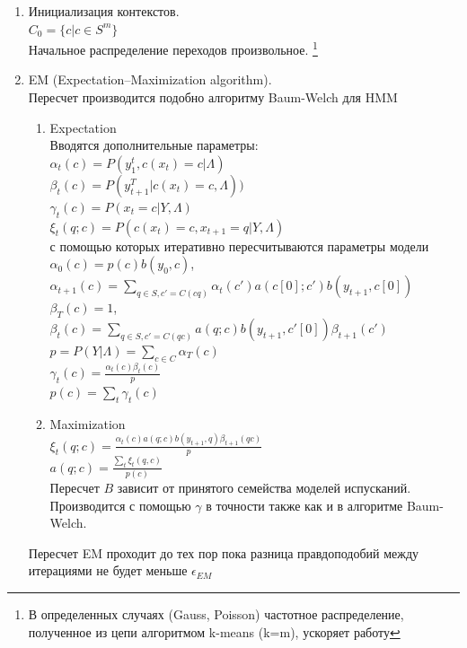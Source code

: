 \documentclass[10pt,a4paper]{article}
\begin{document}
\begin{enumerate}
\item Инициализация контекстов.
\\
$ C_{0} = \{c| c\in S^{m}\}$
\\
Начальное распределение переходов произвольное.
\footnote{В определенных случаях (Gauss, Poisson) частотное распределение, полученное из цепи алгоритмом k-means (k=m), ускоряет работу}
\\
\item EM (Expectation–Maximization algorithm).
\\
Пересчет производится подобно алгоритму Baum-Welch для HMM
\\
\begin{enumerate}
\item Expectation
\\
Вводятся дополнительные параметры:
\\
$ \alpha_{t}(c) = P(y_{1}^{t}, c(x_{t})=c| \Lambda)$
\\
$ \beta_{t}(c) = P(y_{t+1}^{T}| c(x_{t})=c, \Lambda))$
\\
$ \gamma_{t}(c) = P(x_{t}=c|Y,\Lambda) $
\\
$ \xi_{t}(q;c) = P(c(x_{t})=c, x_{t+1} = q| Y, \Lambda)$
\\
с помощью которых итеративно пересчитываются параметры модели
\\
$ \alpha_{0}(c) = p(c)b(y_{0},c)$, 
$ \alpha_{t+1}(c) = \sum_{q \in S, c'=C(cq)}{\alpha_{t}(c')a(c[0];c')b(y_{t+1},c[0])}$
\\
$ \beta_{T}(c) = 1$, 
$ \beta_{t}(c) = \sum_{q \in S, c'=C(qc)}{a(q;c)b(y_{t+1}, c'[0])\beta_{t+1}(c')}$
\\
$p = P(Y|\Lambda) = \sum_{c \in C}\alpha_{T}(c)$
\\ 
$ \gamma_{t}(c) = \frac{\alpha_{t}(c)\beta_{t}(c)}{p}$
\\
$p(c) = \sum_{t}\gamma_{t}(c)$
\item Maximization
\\
$ \xi_{t}(q;c) = \frac{\alpha_{t}(c)a(q;c)b(y_{t+1},q)\beta_{t+1}(qc)}{p} $
\\
$ a(q; c) = \frac{\sum_{t}\xi_{t}(q,c)}{p(c)}$
\\
Пересчет $ B $ зависит от принятого семейства моделей испусканий. Производится с помощью $ \gamma $ в точности также как и в алгоритме Baum-Welch.
\end{enumerate}
Пересчет EM проходит до тех пор пока разница правдоподобий между итерациями не будет меньше $ \epsilon_{EM}$
\\

\end{enumerate}
\end{document}
